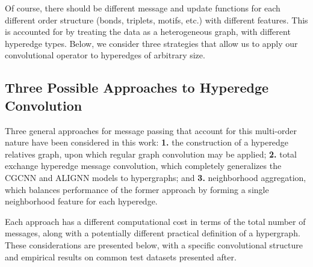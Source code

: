 \documentclass[twoside,twocolumn,9pt]{article}
\begin{document}


Of course, there should be different message and update functions for each different order structure (bonds, triplets, motifs, etc.) with different features. This is accounted for by treating the data as a heterogeneous graph, with different hyperedge types. Below, we consider three strategies that allow us to apply our convolutional operator to hyperedges of arbitrary size.


\subsection{Three Possible Approaches to Hyperedge Convolution}

Three general approaches for message passing that account for this multi-order nature have been considered in this work: \textbf{1.} the construction of a hyperedge relatives graph, upon which regular graph convolution may be applied; \textbf{2.} total exchange hyperedge message convolution, which completely generalizes the CGCNN \cite{cgcnn} and ALIGNN \cite{alignn} models to hypergraphs; and \textbf{3.} neighborhood aggregation, which balances performance of the former approach by forming a single neighborhood feature for each hyperedge.

Each approach has a different computational cost in terms of the total number of messages, along with a potentially different practical definition of a hypergraph. These considerations are presented below, with a specific convolutional structure and empirical results on common test datasets presented after.

\end{document}
